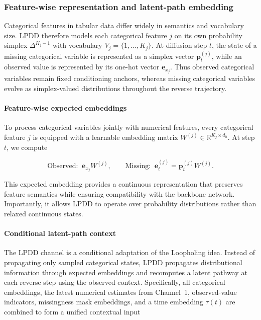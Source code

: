 \documentclass[times, review, 10pt]{elsarticle}
\newcommand{\DIFaddbegin}{\begingroup\color{blue}}
\newcommand{\DIFaddend}{\endgroup}
\begin{document}
\subsubsection{Feature-wise representation and latent-path embedding}

Categorical features in tabular data differ widely in semantics and vocabulary
size. LPDD therefore models each categorical feature $j$ on its own probability
simplex $\Delta^{K_j-1}$ with vocabulary $V_j=\{1,\dots,K_j\}$. At diffusion
step $t$, the state of a missing categorical variable is represented as a
simplex vector $\mathbf{p}_t^{(j)}$, while an observed value is represented by
\DIFaddbegin
its one-hot vector $\mathbf{e}_{x_j}$. Thus observed categorical variables
remain fixed conditioning anchors, whereas missing categorical variables
evolve as simplex-valued distributions throughout the reverse trajectory.
\DIFaddend

\paragraph{Feature-wise expected embeddings}
To process categorical variables jointly with numerical features, every
categorical feature $j$ is equipped with a learnable embedding matrix
$W^{(j)}\in\mathbb{R}^{K_j\times d_h}$. At step $t$, we compute

\begin{equation}
\text{Observed:}\;\; \mathbf{e}_{x_j}W^{(j)}, \qquad
    \text{Missing:}\;\; \mathbf{e}^{(j)}_t = \mathbf{p}_t^{(j)}W^{(j)}.
\end{equation}


This expected embedding provides a continuous representation that preserves
feature semantics while ensuring compatibility with the backbone network.
Importantly, it allows LPDD to operate over probability distributions rather
than relaxed continuous states.

\DIFaddbegin
\paragraph{Conditional latent-path context}
The LPDD channel is a conditional adaptation of the Loopholing idea. Instead
of propagating only sampled categorical states, LPDD propagates distributional
information through expected embeddings and recomputes a latent pathway at
each reverse step using the observed context. Specifically, all categorical
embeddings, the latest numerical estimates from Channel~1, observed-value
indicators, missingness mask embeddings, and a time embedding $\tau(t)$ are
combined to form a unified contextual input
\DIFaddend
\end{document}

